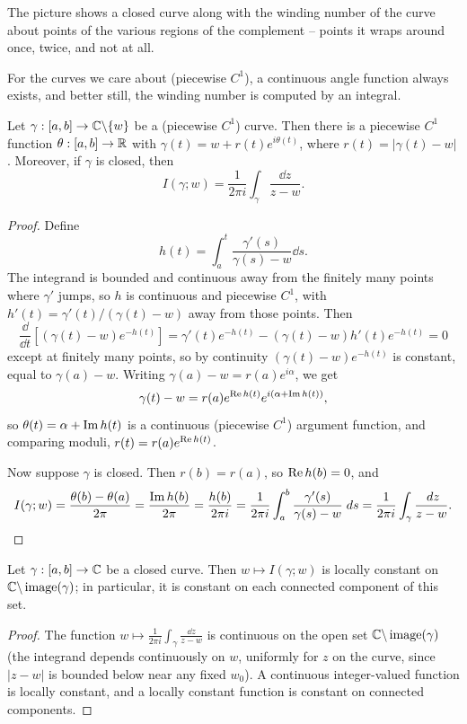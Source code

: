 \documentclass[a4paper]{scrartcl}
\begin{document}
The picture shows a closed curve along with the winding number of the curve about points of the various regions of the complement -- points it wraps around once, twice, and not at all.

For the curves we care about (piecewise $C^1$), a continuous angle function always exists, and better still, the winding number is computed by an integral.

\begin{lemma}
    Let $\gamma: [a, b] \rightarrow \mathbb{C} \backslash \{w\}$ be a (piecewise $C^1$) curve. Then there is a piecewise $C^1$ function $\theta: [a, b] \rightarrow \mathbb{R}$ with $\gamma(t) = w + r(t)e^{i \theta(t)}$, where $r(t) = |\gamma(t) - w|$. Moreover, if $\gamma$ is closed, then
    $$
    I(\gamma; w) = \frac{1}{2 \pi i} \int_\gamma \frac{\dd z}{z - w}.
    $$
\end{lemma}
\begin{proof}
    Define
    $$
    h(t) = \int_a^t \frac{\gamma'(s)}{\gamma(s) - w} \dd s.
    $$
    The integrand is bounded and continuous away from the finitely many points where $\gamma'$ jumps, so $h$ is continuous and piecewise $C^1$, with $h'(t) = \gamma'(t)/(\gamma(t) - w)$ away from those points. Then
    $$
    \frac{\dd}{\dd t}\left[(\gamma(t) - w)e^{-h(t)}\right] = \gamma'(t)e^{-h(t)} - (\gamma(t) - w)h'(t)e^{-h(t)} = 0
    $$
    except at finitely many points, so by continuity $(\gamma(t) - w)e^{-h(t)}$ is constant, equal to $\gamma(a) - w$. Writing $\gamma(a) - w = r(a)e^{i \alpha}$, we get
    $$
    \gamma(t) - w = r(a)e^{\operatorname{Re} h(t)}e^{i(\alpha + \operatorname{Im} h(t))},
    $$
    so $\theta(t) = \alpha + \operatorname{Im} h(t)$ is a continuous (piecewise $C^1$) argument function, and comparing moduli, $r(t) = r(a)e^{\operatorname{Re} h(t)}$.

    Now suppose $\gamma$ is closed. Then $r(b) = r(a)$, so $\operatorname{Re} h(b) = 0$, and
    \[
    I(\gamma; w) = \frac{\theta(b) - \theta(a)}{2 \pi} = \frac{\operatorname{Im} h(b)}{2 \pi} = \frac{h(b)}{2 \pi i} = \frac{1}{2 \pi i}\int_a^b \frac{\gamma'(s)}{\gamma(s) - w} \; d s = \frac{1}{2 \pi i}\int_\gamma \frac{\; d z}{z - w}.
    \]
\end{proof}

\begin{proposition}
    Let $\gamma: [a, b] \rightarrow \mathbb{C}$ be a closed curve. Then $w \mapsto I(\gamma; w)$ is locally constant on $\mathbb{C} \backslash \operatorname{image}(\gamma)$; in particular, it is constant on each connected component of this set.
\end{proposition}
\begin{proof}
    The function $w \mapsto \frac{1}{2 \pi i}\int_\gamma \frac{\dd z}{z - w}$ is continuous on the open set $\mathbb{C} \backslash \operatorname{image}(\gamma)$ (the integrand depends continuously on $w$, uniformly for $z$ on the curve, since $|z - w|$ is bounded below near any fixed $w_0$). A continuous integer-valued function is locally constant, and a locally constant function is constant on connected components.
\end{proof}
\end{document}
